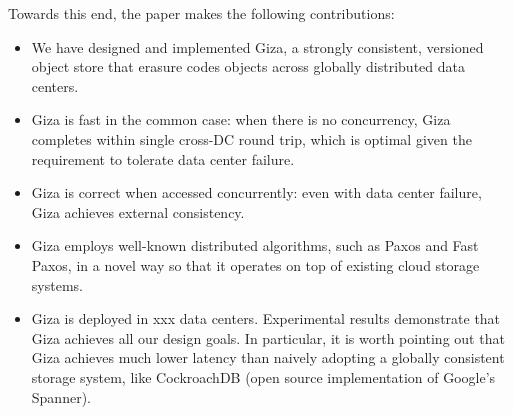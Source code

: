 Towards this end, the paper makes the following contributions:
\begin{itemize}
    \item We have designed and implemented Giza, a strongly consistent,
      versioned object store that erasure codes objects across globally
      distributed data centers.
    \item Giza is fast in the common case: when there is no concurrency, Giza
      completes within single cross-DC round trip, which is optimal given the
      requirement to tolerate data center failure.
    \item Giza is correct when accessed concurrently: even with data center
      failure, Giza achieves external consistency.
    \item Giza employs well-known distributed algorithms, such as Paxos and Fast
      Paxos, in a novel way so that it operates on top of existing cloud storage
      systems.
    \item Giza is deployed in xxx data centers. Experimental results demonstrate
      that Giza achieves all our design goals. In particular, it is worth
      pointing out that Giza achieves much lower latency than naively adopting a
      globally consistent storage system, like CockroachDB (open source
      implementation of Google's Spanner).
\end{itemize}
